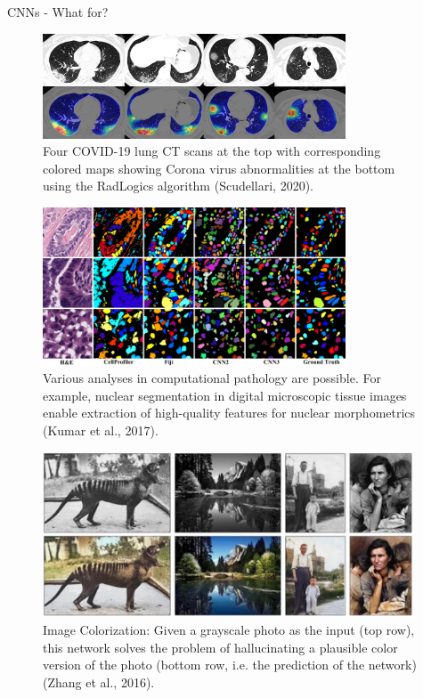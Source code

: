 \begin{vbframe}{CNNs - What for?}
   \begin{figure}
    \centering
    \includegraphics[width=9cm]{figure/hitmap.jpeg}
    \caption{Four COVID-19 lung CT scans at the top with corresponding colored maps showing Corona virus abnormalities at the bottom using the RadLogics algorithm (Scudellari, 2020).}
  \end{figure}
\framebreak

  \begin{figure}
    \centering
    \includegraphics[width=9cm]{figure/instanceseg.png}
    \caption{Various analyses in computational pathology are possible. For example, nuclear segmentation in digital microscopic tissue images enable extraction of high-quality features for nuclear morphometrics (Kumar et al., 2017).}
  \end{figure}
\framebreak

  \begin{figure}
    \centering
    \includegraphics[width=11cm]{figure/colorization.png}
    \caption{Image Colorization: Given a grayscale photo as the input (top row), this network solves the problem of hallucinating a plausible color version of the photo (bottom row, i.e. the prediction of the network) (Zhang et al., 2016).}
  \end{figure}
\framebreak


\end{vbframe}
